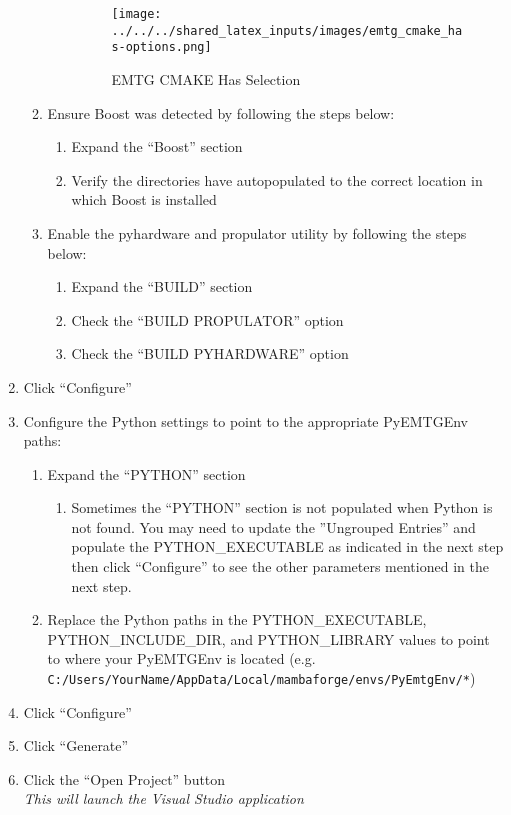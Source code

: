 \begin{enumerate}
\begin{enumerate}
\begin{enumerate}
\begin{figure}[H]
					\texttt{[image: ../../../shared\_latex\_inputs/images/emtg\_cmake\_has-options.png]}
					\caption{EMTG CMAKE Has Selection}
				\end{figure}
		\end{enumerate}
		\item Ensure Boost was detected by following the steps below:
		\begin{enumerate}
			\item Expand the ``Boost'' section
			\item Verify the directories have autopopulated to the correct location in which Boost is installed
		\end{enumerate}
		\item Enable the pyhardware and propulator utility by following the steps below:
		\begin{enumerate}
			\item Expand the ``BUILD'' section 
			\item Check the ``BUILD PROPULATOR'' option
			\item Check the ``BUILD PYHARDWARE'' option
		\end{enumerate}
	\end{enumerate}
	\item Click ``Configure''
	\item Configure the Python settings to point to the appropriate PyEMTGEnv paths:
		\begin{enumerate}
			\item Expand the ``PYTHON'' section
				\begin{enumerate}
					\item Sometimes the ``PYTHON'' section is not populated when Python is not found. You may need to update the ''Ungrouped Entries'' and populate the PYTHON\_EXECUTABLE as indicated in the next step then click ``Configure'' to see the other parameters mentioned in the next step.
				\end{enumerate}
			\item Replace the Python paths in the PYTHON\_EXECUTABLE, PYTHON\_INCLUDE\_DIR, and PYTHON\_LIBRARY values to point to where your PyEMTGEnv is located (e.g. \verb|C:/Users/YourName/AppData/Local/mambaforge/envs/PyEmtgEnv/*|)
		\end{enumerate}
	\item Click ``Configure''
	\item Click ``Generate''
	\item Click the ``Open Project'' button \\ \emph{This will launch the Visual Studio application}
\end{enumerate}